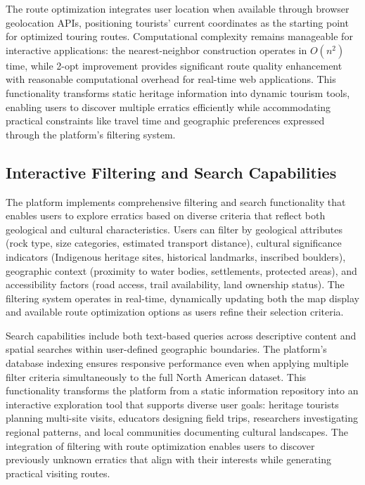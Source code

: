 The route optimization integrates user location when available through browser geolocation APIs, positioning tourists' current coordinates as the starting point for optimized touring routes. Computational complexity remains manageable for interactive applications: the nearest-neighbor construction operates in $O(n^2)$ time, while 2-opt improvement provides significant route quality enhancement with reasonable computational overhead for real-time web applications. This functionality transforms static heritage information into dynamic tourism tools, enabling users to discover multiple erratics efficiently while accommodating practical constraints like travel time and geographic preferences expressed through the platform's filtering system.

\subsection{Interactive Filtering and Search Capabilities}
\label{subsec:filtering_search}

The platform implements comprehensive filtering and search functionality that enables users to explore erratics based on diverse criteria that reflect both geological and cultural characteristics. Users can filter by geological attributes (rock type, size categories, estimated transport distance), cultural significance indicators (Indigenous heritage sites, historical landmarks, inscribed boulders), geographic context (proximity to water bodies, settlements, protected areas), and accessibility factors (road access, trail availability, land ownership status). The filtering system operates in real-time, dynamically updating both the map display and available route optimization options as users refine their selection criteria.

Search capabilities include both text-based queries across descriptive content and spatial searches within user-defined geographic boundaries. The platform's database indexing ensures responsive performance even when applying multiple filter criteria simultaneously to the full North American dataset. This functionality transforms the platform from a static information repository into an interactive exploration tool that supports diverse user goals: heritage tourists planning multi-site visits, educators designing field trips, researchers investigating regional patterns, and local communities documenting cultural landscapes. The integration of filtering with route optimization enables users to discover previously unknown erratics that align with their interests while generating practical visiting routes.

